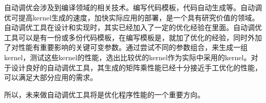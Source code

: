 自动调优会涉及到编译领域的相关技术。编写代码模板，代码自动生成等。自动调优可提高kernel生成的速度，加快实际应用的部署，是一个具有研究价值的领域。自动调优工具在设计和实现时，其实已经加入了一定的优化经验在里面。自动调优工具可以是有一份或多份代码模板，在编写模板是，就加了优化的经验，同时外加了对性能有重要影响的关键可变参数。通过尝试不同的参数组合，来生成一组kernel，测试这些kernel的性能，选出比较优的kernel作为实际中采用的kernel。对于设计良好的自动调优工具，其生成的矩阵乘性能已经十分接近手工优化的性能，可以满足大部分应用的需求。

所以，未来做自动调优工具将是优化程序性能的一个重要方向。
